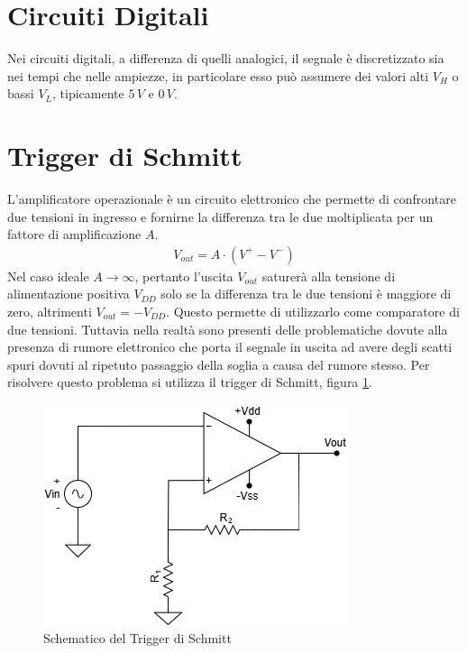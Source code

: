 \documentclass[a4paper,12pt]{article}
\begin{document}


\section{Circuiti Digitali}

Nei circuiti digitali, a differenza di quelli analogici, il segnale è discretizzato sia nei tempi che nelle ampiezze, in particolare esso può assumere dei valori alti $V_H$ o bassi $V_L$, tipicamente $5\,V$ e $0\,V$. 


\section*{Trigger di Schmitt}
L'amplificatore operazionale è un circuito elettronico che permette di confrontare due tensioni in ingresso e fornirne la differenza tra le due moltiplicata per un fattore di amplificazione $A$.
\begin{align*}
	V_{out} = A \cdot (V^+ - V^-)
\end{align*}
Nel caso ideale $ A \rightarrow \infty $, pertanto l'uscita $V_{out}$ saturerà alla tensione di alimentazione positiva $V_{DD}$ solo se la differenza tra le due tensioni è maggiore di zero, altrimenti $V_{out} = -V_{DD}$.
Questo permette di utilizzarlo come comparatore di due tensioni. Tuttavia nella realtà sono presenti delle problematiche dovute alla presenza di rumore elettronico che porta il segnale in uscita ad avere degli scatti spuri dovuti al ripetuto passaggio della soglia a causa del rumore stesso.
Per risolvere questo problema si utilizza il trigger di Schmitt, figura \ref{fig:trigger_schmitt}.

\begin{figure}[h]
	\centering
	\includegraphics[width = 0.55\linewidth]{./immagini/schmitt/circuito.png}
	\caption{Schematico del Trigger di Schmitt}
	\label{fig:trigger_schmitt}
\end{figure}
\end{document}
